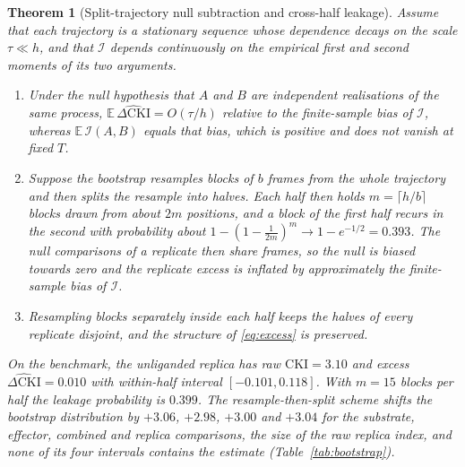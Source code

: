 \documentclass[11pt,reqno]{amsart}
\theoremstyle{plain}
\newtheorem{theorem}{Theorem}[section]
\theoremstyle{definition}
\theoremstyle{remark}
\numberwithin{equation}{section}
\newcommand{\EE}{\mathbb{E}}
\newcommand{\DCKI}{\Delta\mathrm{CKI}}
\begin{document}
\begin{theorem}[Split-trajectory null subtraction and cross-half leakage]\label{thm:null}
Assume that each trajectory is a stationary sequence whose dependence decays on the scale $\tau\ll h$, and that $\mathcal I$ depends continuously on the empirical first and second moments of its two arguments.
\begin{enumerate}[label=\textup{(\arabic*)},leftmargin=*]
\item Under the null hypothesis that $A$ and $B$ are independent realisations of the same process, $\EE\,\widehat{\DCKI}=O(\tau/h)$ relative to the finite-sample bias of $\mathcal I$, whereas $\EE\,\mathcal I(A,B)$ equals that bias, which is positive and does not vanish at fixed $T$.
\item Suppose the bootstrap resamples blocks of $b$ frames from the whole trajectory and then splits the resample into halves. Each half then holds $m=\lceil h/b\rceil$ blocks drawn from about $2m$ positions, and a block of the first half recurs in the second with probability about $1-(1-\tfrac1{2m})^m\to1-e^{-1/2}=0.393$. The null comparisons of a replicate then share frames, so the null is biased towards zero and the replicate excess is inflated by approximately the finite-sample bias of $\mathcal I$.
\item Resampling blocks separately inside each half keeps the halves of every replicate disjoint, and the structure of \eqref{eq:excess} is preserved.
\end{enumerate}
On the benchmark, the unliganded replica has raw $\mathrm{CKI}=3.10$ and excess $\widehat{\DCKI}=0.010$ with within-half interval $[-0.101,0.118]$. With $m=15$ blocks per half the leakage probability is $0.399$. The resample-then-split scheme shifts the bootstrap distribution by $+3.06$, $+2.98$, $+3.00$ and $+3.04$ for the substrate, effector, combined and replica comparisons, the size of the raw replica index, and none of its four intervals contains the estimate (Table~\ref{tab:bootstrap}).
\end{theorem}
\end{document}
